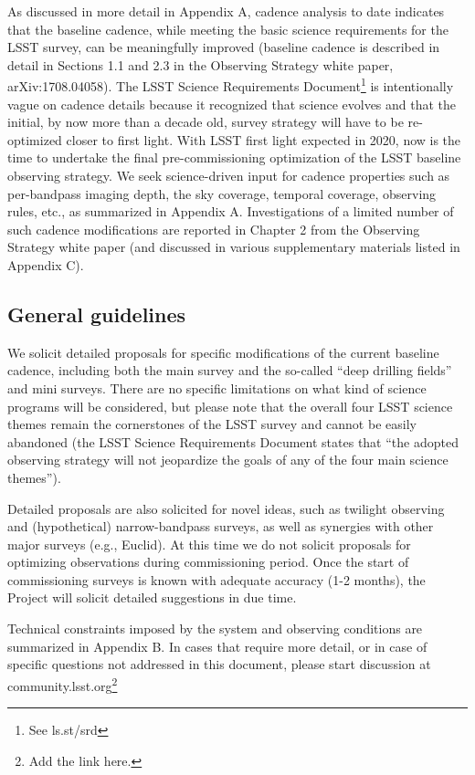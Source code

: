 \documentclass[DM,lsstdraft,toc,usenatbib]{lsstdoc}
\begin{document}
As discussed in more detail in Appendix A, cadence analysis to date indicates that the baseline 
cadence, while meeting the basic science requirements for the LSST survey, can be meaningfully 
improved (baseline cadence is described in detail in Sections 1.1 and 2.3 in the Observing Strategy
white paper, arXiv:1708.04058). The LSST Science Requirements Document\footnote{See ls.st/srd} 
is intentionally vague on cadence details because it recognized that science evolves and that the 
initial, by now more than a decade old, survey strategy will have to be re-optimized closer to first 
light. With LSST first light expected in 2020, now is the time to undertake the final pre-commissioning
optimization of the LSST baseline observing strategy. We seek science-driven input for cadence 
properties such as per-bandpass imaging depth, the sky coverage, temporal coverage, observing
rules, etc., as summarized in Appendix A. Investigations of a limited number of such cadence 
modifications are reported in Chapter 2 from the Observing Strategy white paper (and discussed 
in various supplementary materials listed in Appendix C). 



\subsection{General guidelines} 

We solicit detailed proposals for specific modifications of the current baseline cadence, including 
both the main survey and the so-called ``deep drilling fields'' and mini surveys. There are no 
specific limitations on what kind of science programs will be considered, but please note that 
the overall four LSST science themes remain the cornerstones of the LSST survey and cannot 
be easily abandoned (the LSST Science Requirements Document states that ``the adopted observing 
strategy will not jeopardize the goals of any of the four main science themes''). 

Detailed proposals are also solicited for novel ideas, such as twilight observing and (hypothetical) 
narrow-bandpass surveys, as well as synergies with other major surveys (e.g., Euclid). At this 
time we do not solicit proposals for optimizing observations during commissioning period. Once 
the start of commissioning surveys is known with adequate accuracy (1-2 months), the Project will 
solicit detailed suggestions in due time. 

Technical constraints imposed by the system and observing conditions are summarized in 
Appendix B. In cases that require more detail, or in case of specific questions not addressed in this 
document, please start discussion at community.lsst.org\footnote{Add the link here.} 
\end{document}
